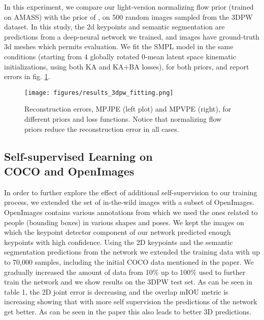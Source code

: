 \documentclass[runningheads]{llncs}
\begin{document}
In this experiment, we compare our light-version normalizing flow prior (trained on AMASS) with the prior of \cite{pavlakoscvpr2019}, on 500 random images sampled from the 3DPW dataset. In this study, the 2d keypoints and semantic segmentation are predictions from a deep-neural network we trained, and images have ground-truth 3d meshes which permits evaluation. We fit the SMPL model in the same conditions (starting from 4 globally rotated 0-mean latent space kinematic initializations, using both KA and KA+BA losses), for both priors, and report errors in fig. \ref{fig:3dpw_fitting}.

\begin{figure}[!ht]
\begin{center}
    \texttt{[image: figures/results\_3dpw\_fitting.png]}
\end{center}
\caption{Reconstruction errors, MPJPE (left plot) and MPVPE (right), for different priors and loss functions. Notice that normalizing flow priors reduce the reconstruction error in all cases.}
\label{fig:3dpw_fitting}
\end{figure}    

\subsection{Self-supervised Learning on\\COCO and OpenImages}

In order to further explore the effect of additional self-supervision to our training process, we extended the set of in-the-wild images with a subset of OpenImages\cite{OpenImages}. OpenImages contains various annotations from which we used the ones related to people (bounding boxes) in various shapes and poses. We kept the images on which the keypoint detector component of our network predicted enough keypoints with high confidence. Using the 2D keypoints and the semantic segmentation predictions from the network we extended the training data with up to 70,000 samples, including the initial COCO data mentioned in the paper. We gradually increased the amount of data from 10\% up to 100\% used to further train the network and we show results on the 3DPW test set. As can be seen in table 1, the 2D joint error is decreasing and the overlap mIOU metric is increasing showing that with more self supervision the predictions of the network get better. As can be seen in the paper this also leads to better 3D predictions.
\end{document}
